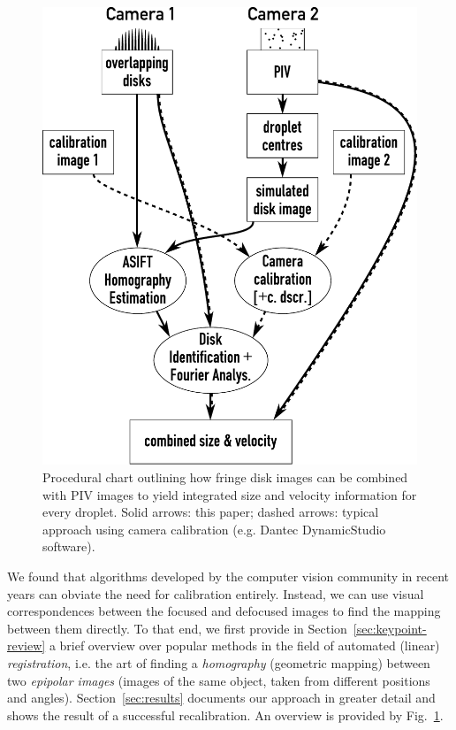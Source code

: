 \documentclass[11.5pt,oneside]{book}
\newcommand*{\figref}[1]{Fig.~\ref{#1}}
\newcommand*{\secref}[1]{Section~\ref{#1}}
\begin{document}
\begin{figure}
    \centering
    \includegraphics[height=0.75\textheight]{img/overlapping_flowchart.pdf}
    \caption{Procedural chart outlining how fringe disk images can be combined with
    PIV images to yield integrated size and velocity information for every
    droplet. Solid arrows: this paper; dashed arrows: typical approach using
  camera calibration (e.g. Dantec DynamicStudio software).}
\label{fig:overlapping-flowchart}
\end{figure}

We found that algorithms developed by the computer
vision community in recent years can obviate the need for calibration entirely.
Instead, we can use visual correspondences between the focused and defocused
images to find the mapping between them directly. To that end, we first provide
in \secref{sec:keypoint-review} a brief overview over popular methods in the field of automated (linear)
\emph{registration}, i.e. the art of finding a \emph{homography} (geometric
mapping) between two \emph{epipolar images} (images of the same object, taken
from different positions and angles). \secref{sec:results} documents 
our approach in greater detail and shows the result of a successful
recalibration. An overview is provided by \figref{fig:overlapping-flowchart}.
\end{document}
